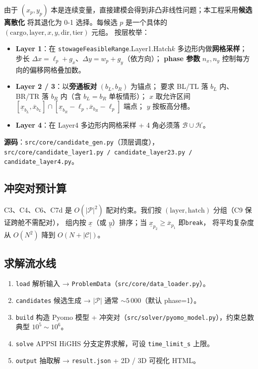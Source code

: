 \documentclass[a4paper,11pt]{ctexart}
\newcommand{\set}[1]{\mathcal{#1}}
\begin{document}
由于 $(x_p, y_p)$ 本是连续变量，直接建模会得到非凸非线性问题；本工程采用\textbf{候选离散化}
将其退化为 0-1 选择。每候选 $p$ 是一个具体的 $(\text{cargo},\text{layer},x,y,\text{dir},\text{tier})$ 元组。
按层枚举：

\begin{itemize}[leftmargin=2em,itemsep=2pt]
\item \textbf{Layer 1}：在 \texttt{stowageFeasibleRange}.Layer1.Hatch$k$ 多边形内做\textbf{网格采样}；
步长 $\Delta x = \ell_p + g_x$、$\Delta y = w_p + g_y$（依方向）；
\textbf{phase 参数} $n_x, n_y$ 控制每方向的偏移网格叠加数。
\item \textbf{Layer 2 / 3}：以\textbf{旁通板对} $(b_L, b_R)$ 为锚点；
要求 BL/TL 落 $b_L$ 内、BR/TR 落 $b_R$ 内（含 $b_L=b_R$ 单板情形）；
$x$ 取允许区间 $[\underline{x}_{b_L},\overline{x}_{b_L}]\cap[\underline{x}_{b_R}-\ell_p,\overline{x}_{b_R}-\ell_p]$ 端点；
$y$ 按板高分槽。
\item \textbf{Layer 4}：在 Layer4 多边形内网格采样 + 4 角必须落 $\set{B}\cup\set{H}$。
\end{itemize}

\textbf{源码}：\texttt{src/core/candidate\_gen.py}（顶层调度），
\texttt{src/core/candidate\_layer1.py / candidate\_layer23.py / candidate\_layer4.py}。

\subsection{冲突对预计算}

C3、C4、C6、C7d 是 $O(|\set{P}|^2)$ 配对约束。我们按 $(\text{layer},\text{hatch})$ 分组（C9 保证跨舱不需配对），
组内按 $\underline{x}$（或 $\underline{y}$）排序；当 $\underline{x}_{p_2}\geq\overline{x}_{p_1}$ 即\texttt{break}，
将平均复杂度从 $O(N^2)$ 降到 $O(N + |\set{C}|)$。

\subsection{求解流水线}

\begin{enumerate}[leftmargin=2em,itemsep=2pt]
\item \texttt{load} 解析输入 → \texttt{ProblemData}（\texttt{src/core/data\_loader.py}）。
\item \texttt{candidates} 候选生成 → $|\set{P}|$ 通常 $\sim 5\,000$（默认 phase=1）。
\item \texttt{build} 构造 Pyomo 模型 + 冲突对（\texttt{src/solver/pyomo\_model.py}），约束总数典型 $10^5\sim 10^6$。
\item \texttt{solve} APPSI HiGHS 分支定界求解，可设 \texttt{time\_limit\_s} 上限。
\item \texttt{output} 抽取解 → \texttt{result.json} + 2D / 3D 可视化 HTML。
\end{enumerate}
\end{document}
